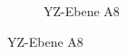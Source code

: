 \begin{appendix}
\begin{landscape}
\begin{figure}[!ht]
\begin{subfigure}[t]{0.5\textwidth}
				\caption{YZ-Ebene A8}
	\end{subfigure}      
\end{figure}
\newpage
\end{landscape}
%
%
%
%
%		
%

\end{appendix}

